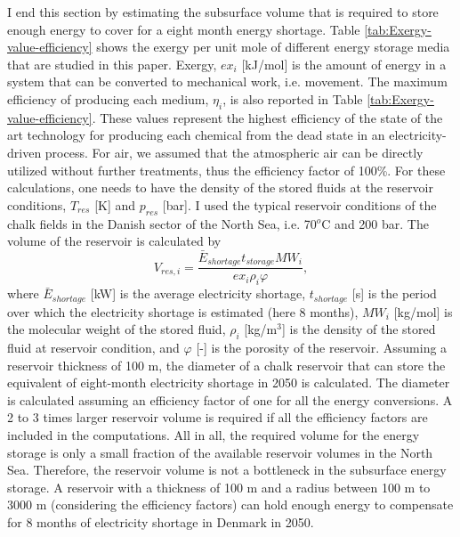 \documentclass{ECOS_2021}
\begin{document}
I end this section by estimating the subsurface volume that is required
to store enough energy to cover for a eight month energy shortage.
Table \ref{tab:Exergy-value-efficiency} shows the exergy per unit
mole of different energy storage media that are studied in this paper.
Exergy, $ex_{i}$ {[}kJ/mol{]} is the amount of energy in a system
that can be converted to mechanical work, i.e. movement. The maximum
efficiency of producing each medium, $\eta_{i}$, is also reported
in Table \ref{tab:Exergy-value-efficiency}. These values represent the 
highest efficiency of the state of the art technology for producing each chemical 
from the dead state in an electricity-driven process. For air, we assumed that the 
atmospheric air can be directly utilized without further treatments, thus the
efficiency factor of 100\%. For these calculations,
one needs to have the density of the stored fluids at the reservoir conditions,
$T_{res}$ {[}K{]} and $p_{res}$ {[}bar{]}. I used the typical reservoir
conditions of the chalk fields in the Danish sector of the North Sea,
i.e. 70$^{o}$C and 200 bar. The volume of the reservoir is calculated
by
\[
V_{res,i}=\frac{\bar{E}_{shortage}t_{storage}MW_{i}}{ex_{i}\rho_{i}\varphi},
\]
where $\bar{E}_{shortage}$ {[}kW{]} is the average electricity shortage,
$t_{shortage}$ {[}s{]} is the period over which the electricity shortage
is estimated (here 8 months), $MW_{i}$ {[}kg/mol{]} is the molecular
weight of the stored fluid, $\rho_{i}$ {[}kg/m$^{3}${]} is the density
of the stored fluid at reservoir condition, and $\varphi$ {[}-{]}
is the porosity of the reservoir. Assuming a reservoir thickness of
100 m, the diameter of a chalk reservoir that can store the equivalent
of eight-month electricity shortage in 2050 is calculated. The diameter is calculated assuming
an efficiency factor of one for all the energy conversions. A 2 to
3 times larger reservoir volume is required if all the efficiency
factors are included in the computations. All in all, the required
volume for the energy storage is only a small fraction of the available
reservoir volumes in the North Sea. Therefore, the reservoir volume
is not a bottleneck in the subsurface energy storage. A reservoir
with a thickness of 100 m and a radius between 100 m to 3000 m (considering
the efficiency factors) can hold enough energy to compensate for 8
months of electricity shortage in Denmark in 2050. 
\end{document}
